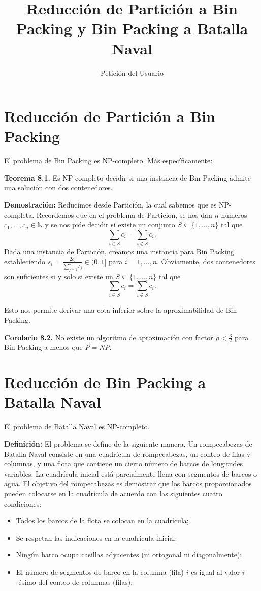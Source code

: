 \documentclass{article}
\title{Reducción de Partición a Bin Packing y Bin Packing a Batalla Naval}
\author{Petición del Usuario}
\begin{document}
\maketitle

\section{Reducción de Partición a Bin Packing}

El problema de Bin Packing es NP-completo. Más específicamente:

\textbf{Teorema 8.1.} Es NP-completo decidir si una instancia de Bin Packing admite una solución con dos contenedores.

\textbf{Demostración:} Reducimos desde Partición, la cual sabemos que es NP-completa. Recordemos que en el problema de Partición, se nos dan $n$ números $c_1, \dots, c_n \in \mathbb{N}$ y se nos pide decidir si existe un conjunto $S \subseteq \{1, \dots, n\}$ tal que
\[
\sum_{i \in S} c_i = \sum_{i \notin S} c_i.
\]
Dada una instancia de Partición, creamos una instancia para Bin Packing estableciendo $s_i = \frac{2c_i}{\sum_{j=1}^{n} c_j} \in (0, 1]$ para $i = 1, \dots, n$. Obviamente, dos contenedores son suficientes si y solo si existe un $S \subseteq \{1, \dots, n\}$ tal que
\[
\sum_{i \in S} c_i = \sum_{i \notin S} c_i.
\]

Esto nos permite derivar una cota inferior sobre la aproximabilidad de Bin Packing.

\textbf{Corolario 8.2.} No existe un algoritmo de aproximación con factor $\rho < \frac{3}{2}$ para Bin Packing a menos que $P = NP$.

\section{Reducción de Bin Packing a Batalla Naval}

El problema de Batalla Naval es NP-completo.

\textbf{Definición:} El problema se define de la siguiente manera. Un rompecabezas de Batalla Naval consiste en una cuadrícula de rompecabezas, un conteo de filas y columnas, y una flota que contiene un cierto número de barcos de longitudes variables. La cuadrícula inicial está parcialmente llena con segmentos de barcos o agua. El objetivo del rompecabezas es demostrar que los barcos proporcionados pueden colocarse en la cuadrícula de acuerdo con las siguientes cuatro condiciones:
\begin{itemize}
    \item Todos los barcos de la flota se colocan en la cuadrícula;
    \item Se respetan las indicaciones en la cuadrícula inicial;
    \item Ningún barco ocupa casillas adyacentes (ni ortogonal ni diagonalmente);
    \item El número de segmentos de barco en la columna (fila) $i$ es igual al valor $i$-ésimo del conteo de columnas (filas).
\end{itemize}
\end{document}
